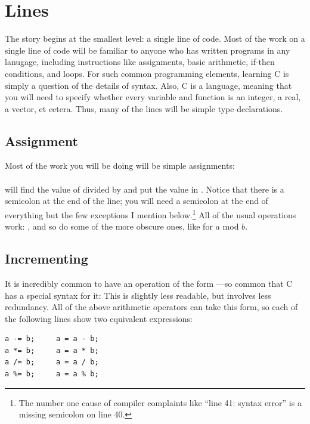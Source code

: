 \documentclass[12pt]{article}
\def\ind#1{\index{#1}#1}
\begin{document}
\section{Lines} \label{fncontents}

The story begins at the smallest level: a single line of code. Most of
the work on a single line of code will be familiar to anyone who has
written programs in any lanugage, including instructions like assignments,
basic arithmetic, if-then conditions, and loops. For such common
programming elements, learning C is simply a question of the details
of syntax. Also, C is a  language, meaning that you will
need to specify whether every variable and function is an integer,
a real, a vector, et cetera. Thus, many of the lines will be simple
type declarations.

\subsection{Assignment}   \index{=}
Most of the work you will be doing will be simple assignments:\\
\\
will find the value of  divided by  and put the
value in . Notice that there is a semicolon at the end of
the line; you will need a semicolon at the end of everything but the few
exceptions I mention below.\footnote{The number one cause of compiler
complaints like ``line 41: \ind{syntax error}'' is a missing semicolon on line 40.} All of the usual operations work: \ci{+
- / *}, and so do some of the more obscure ones, like 
for $a$ mod $b$.  \index{\%}

\subsection{Incrementing} It is incredibly common to have an operation of the form ---so
common that C has a special syntax for it:  This is slightly less readable, but involves less
redundancy. All of the above arithmetic operators can take this form, so each of the following lines show two
equivalent expressions: \\
\begin{lstlisting}
a -= b;     a = a - b;
a *= b;     a = a * b;
a /= b;     a = a / b;
a %= b;     a = a % b;
\end{lstlisting}
\end{document}
